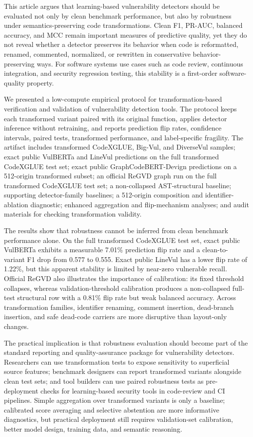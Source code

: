 \documentclass[a4paper,fleqn]{cas-dc}
\begin{document}
This article argues that learning-based vulnerability detectors should be
evaluated not only by clean benchmark performance, but also by robustness under
semantics-preserving code transformations. Clean F1, PR-AUC, balanced accuracy,
and MCC remain important measures of predictive quality, yet they do not reveal
whether a detector preserves its behavior when code is reformatted, renamed,
commented, normalized, or rewritten in conservative behavior-preserving ways.
For software systems use cases such as code review, continuous integration, and
security regression testing, this stability is a first-order software-quality
property.

We presented a low-compute empirical protocol for transformation-based
verification and validation of vulnerability detection tools. The protocol
keeps each transformed variant paired with its original function, applies
detector inference without retraining, and reports prediction flip rates,
confidence intervals, paired tests, transformed performance, and label-specific
fragility. The artifact includes transformed
CodeXGLUE, Big-Vul, and DiverseVul samples; exact public VulBERTa and LineVul
predictions on the full transformed CodeXGLUE test set; exact public
GraphCodeBERT-Devign predictions on a 512-origin transformed subset; an
official ReGVD graph run on the full transformed CodeXGLUE test set; a
non-collapsed AST-structural baseline; supporting detector-family baselines; a 512-origin composition and
identifier-ablation diagnostic; enhanced aggregation and flip-mechanism
analyses; and audit materials for checking transformation validity.

The results show that robustness cannot be inferred from clean benchmark
performance alone. On the full transformed CodeXGLUE test set, exact public
VulBERTa exhibits a measurable 7.01\% prediction flip rate and a clean-to-
variant F1 drop from 0.577 to 0.555. Exact public LineVul has a lower flip rate
of 1.22\%, but this apparent stability is limited by near-zero vulnerable
recall. Official ReGVD also illustrates the importance of calibration: its
fixed threshold collapses, whereas validation-threshold calibration produces a
non-collapsed full-test structural row with a 0.81\% flip rate but weak
balanced accuracy. Across
transformation families, identifier renaming, comment insertion, dead-branch
insertion, and safe dead-code carriers are more disruptive than layout-only
changes.

The practical implication is that robustness evaluation should become part of
the standard reporting and quality-assurance package for vulnerability
detectors. Researchers can use transformation tests to expose sensitivity to
superficial source features; benchmark designers can report transformed
variants alongside clean test sets; and tool builders can use paired
robustness tests as pre-deployment checks for learning-based security tools in
code-review and CI pipelines. Simple aggregation over transformed variants is
only a baseline; calibrated score averaging and selective abstention are more
informative diagnostics, but practical deployment still requires validation-set
calibration, better model design, training data, and semantic reasoning.
\end{document}

